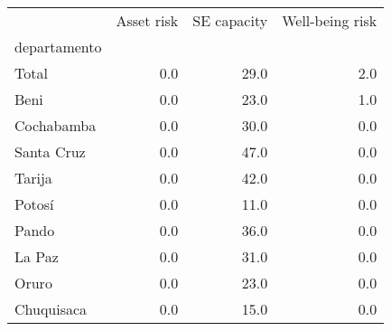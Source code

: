 \begin{tabular}{lrrr}
\toprule
{} &  Asset risk &  SE capacity &  Well-being risk \\
departamento &             &              &                  \\
\midrule
Total        &         0.0 &         29.0 &              2.0 \\
Beni         &         0.0 &         23.0 &              1.0 \\
Cochabamba   &         0.0 &         30.0 &              0.0 \\
Santa Cruz   &         0.0 &         47.0 &              0.0 \\
Tarija       &         0.0 &         42.0 &              0.0 \\
Potosí       &         0.0 &         11.0 &              0.0 \\
Pando        &         0.0 &         36.0 &              0.0 \\
La Paz       &         0.0 &         31.0 &              0.0 \\
Oruro        &         0.0 &         23.0 &              0.0 \\
Chuquisaca   &         0.0 &         15.0 &              0.0 \\
\bottomrule
\end{tabular}

